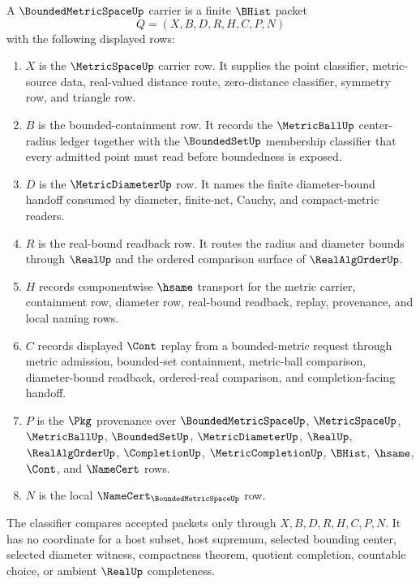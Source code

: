 \begin{definition}
\label{def:bounded-metric-space-carrier}
A $\BoundedMetricSpaceUp$ carrier is a finite $\BHist$ packet
$$
Q=(X,B,D,R,H,C,P,N)
$$
with the following displayed rows:
\begin{enumerate}
\item $X$ is the $\MetricSpaceUp$ carrier row. It supplies the point classifier, metric-source data, real-valued distance route, zero-distance classifier, symmetry row, and triangle row.
\item $B$ is the bounded-containment row. It records the $\MetricBallUp$ center-radius ledger together with the $\BoundedSetUp$ membership classifier that every admitted point must read before boundedness is exposed.
\item $D$ is the $\MetricDiameterUp$ row. It names the finite diameter-bound handoff consumed by diameter, finite-net, Cauchy, and compact-metric readers.
\item $R$ is the real-bound readback row. It routes the radius and diameter bounds through $\RealUp$ and the ordered comparison surface of $\RealAlgOrderUp$.
\item $H$ records componentwise $\hsame$ transport for the metric carrier, containment row, diameter row, real-bound readback, replay, provenance, and local naming rows.
\item $C$ records displayed $\Cont$ replay from a bounded-metric request through metric admission, bounded-set containment, metric-ball comparison, diameter-bound readback, ordered-real comparison, and completion-facing handoff.
\item $P$ is the $\Pkg$ provenance over $\BoundedMetricSpaceUp$, $\MetricSpaceUp$, $\MetricBallUp$, $\BoundedSetUp$, $\MetricDiameterUp$, $\RealUp$, $\RealAlgOrderUp$, $\CompletionUp$, $\MetricCompletionUp$, $\BHist$, $\hsame$, $\Cont$, and $\NameCert$ rows.
\item $N$ is the local $\NameCert_{\BoundedMetricSpaceUp}$ row.
\end{enumerate}
The classifier compares accepted packets only through $X,B,D,R,H,C,P,N$. It has no coordinate for a host subset, host supremum, selected bounding center, selected diameter witness, compactness theorem, quotient completion, countable choice, or ambient $\RealUp$ completeness.
\end{definition}


